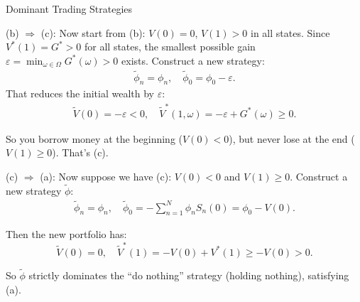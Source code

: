 \documentclass{beamer}
\begin{document}
\begin{frame}{Dominant Trading Strategies}

    {\footnotesize \footnotesize
    \par  (b) \(\Rightarrow\) (c): Now start from (b): \( V(0) = 0 \), \( V(1) > 0 \) in all states.
    Since \( V^*(1) = G^* > 0 \) for all states, the smallest possible gain $\varepsilon = \min_{\omega \in \Omega} G^*(\omega) > 0$
    exists. Construct a new strategy:
    \vspace{-1em}
    \begin{align*}
        \tilde{\phi}_n = \phi_n, \quad \tilde{\phi}_0 = \phi_0 - \varepsilon.
    \end{align*}
    That reduces the initial wealth by \(\varepsilon\):
    \begin{align*}
        \tilde{V}(0) = -\varepsilon < 0, \quad \tilde{V}^*(1, \omega) = -\varepsilon + G^*(\omega) \geq 0.
    \end{align*}
    \par So you borrow money at the beginning (\(V(0) < 0\)), but never lose at the end (\(V(1) \geq 0\)). That's (c).
    \par (c) $\Rightarrow$ (a): Now suppose we have (c): \( V(0) < 0 \) and \( V(1) \geq 0 \). 
    Construct a new strategy \(\tilde{\phi}\):
    \vspace{-1em}
    \begin{align*}
        \tilde{\phi}_n = \phi_n, \quad \tilde{\phi}_0 = -\sum_{n=1}^{N} \phi_n S_n(0) = \phi_0 - V(0).
    \end{align*}
    \vspace{-1em}
    \par Then the new portfolio has:
%
\[
\tilde{V}(0) = 0, \quad \tilde{V}^*(1) = -V(0) + V^*(1) \geq -V(0) > 0.
\]
\par So \(\tilde{\phi}\) strictly dominates the ``do nothing'' strategy (holding nothing), satisfying (a).
    }
\end{frame}
\end{document}
